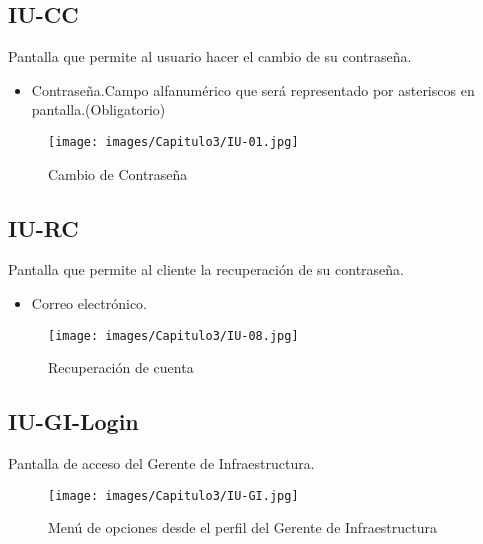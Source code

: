 \hypertarget{IU:IU-CC}{}
\subsection{IU-CC}
    Pantalla que permite al usuario hacer el cambio de su contraseña.
\begin{itemize}
    \item Contraseña.Campo alfanumérico que será representado por asteriscos en pantalla.(Obligatorio)
\end{itemize}
\begin{figure}[htbp!]
    \texttt{[image: images/Capitulo3/IU-01.jpg]}
    \caption{Cambio de Contraseña}
    \label{fig:my_label}
\end{figure}
\clearpage

\hypertarget{IU:IU-RC}{}
\subsection{IU-RC}
   Pantalla que permite al cliente la recuperación de su contraseña.
    \begin{itemize}
        \item Correo electrónico. 
    \end{itemize}
\begin{figure}[htbp!]
    \texttt{[image: images/Capitulo3/IU-08.jpg]}
    \caption{Recuperación de cuenta}
    \label{fig:my_label}
\end{figure}
\clearpage

\hypertarget{IU:IU-GI-Login}{}
\subsection{IU-GI-Login}
    Pantalla de acceso del Gerente de Infraestructura.
\begin{figure}[htbp!]
    \texttt{[image: images/Capitulo3/IU-GI.jpg]}
    \caption{Menú de opciones desde el perfil del Gerente de Infraestructura}
    \label{fig:my_label}
\end{figure}
\clearpage


\hypertarget{IU:IU-REG}{}
